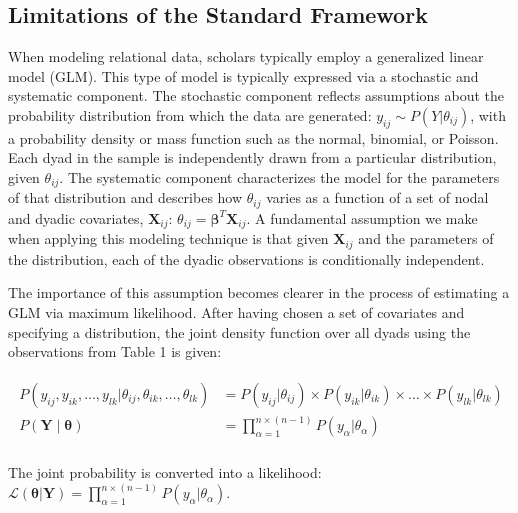 \documentclass[12pt,pdflatex]{elsarticle}
\begin{document}
\subsection{Limitations of the Standard Framework}

When modeling relational data, scholars typically employ a generalized linear model (GLM). This type of model is typically expressed via a stochastic and systematic component.
The stochastic component reflects assumptions about the probability distribution from which the data are generated: $y_{ij} \sim P(Y | \theta_{ij})$, with a probability density or mass function such as the normal, binomial, or Poisson. Each dyad in the sample is independently drawn from a particular distribution, given $\theta_{ij}$. The systematic component characterizes the model for the parameters of that distribution and describes how $\theta_{ij}$ varies as a function of a set of nodal and dyadic covariates, $\mathbf{X}_{ij}$: $\theta_{ij} = \bm\beta^{T} \mathbf{X}_{ij}$. A fundamental assumption we make when applying this modeling technique is that given $\mathbf{X}_{ij}$ and the parameters of the distribution, each of the dyadic observations is conditionally independent. 

The importance of this assumption becomes clearer in the process of estimating a GLM via maximum likelihood. After having chosen a set of covariates and specifying a distribution, the joint density function over all dyads using the observations from Table 1 is given:

\vspace{-8mm}
\begin{align}
\begin{aligned}
	P(y_{ij}, y_{ik}, \ldots, y_{lk} | \theta_{ij}, \theta_{ik}, \ldots, \theta_{lk}) &= P(y_{ij} | \theta_{ij}) \times P(y_{ik} | \theta_{ik}) \times \ldots \times P(y_{lk} | \theta_{lk}) \\
	P(\mathbf{Y} \; | \; \bm{\theta}) &= \prod_{\alpha=1}^{n \times (n-1)} P(y_{\alpha} | \theta_{\alpha})  \\
\end{aligned}
\end{align}

\noindent The joint probability is converted into a likelihood: $\displaystyle \mathcal{L} (\bm{\theta} | \mathbf{Y}) = \prod_{\alpha=1}^{n \times (n-1)} P(y_{\alpha} | \theta_{\alpha})$.
\end{document}
